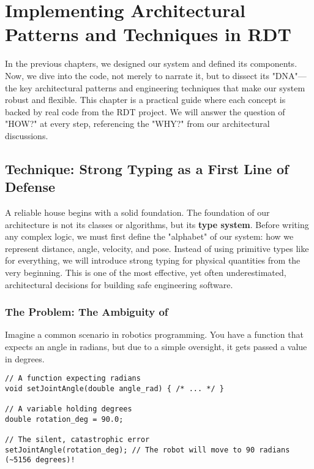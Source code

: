 
\chapter{Implementing Architectural Patterns and Techniques in RDT}
\label{chap:implementation_patterns}

In the previous chapters, we designed our system and defined its components. Now, we dive into the code, not merely to narrate it, but to dissect its "DNA"—the key architectural patterns and engineering techniques that make our system robust and flexible. This chapter is a practical guide where each concept is backed by real code from the RDT project. We will answer the question of "HOW?" at every step, referencing the "WHY?" from our architectural discussions.

\section{Technique: Strong Typing as a First Line of Defense}
\label{sec:strong_typing}

A reliable house begins with a solid foundation. The foundation of our architecture is not its classes or algorithms, but its \textbf{type system}. Before writing any complex logic, we must first define the "alphabet" of our system: how we represent distance, angle, velocity, and pose. Instead of using primitive types like  for everything, we will introduce strong typing for physical quantities from the very beginning. This is one of the most effective, yet often underestimated, architectural decisions for building safe engineering software.

\subsection{The Problem: The Ambiguity of }
\label{subsec:problem_of_double}

Imagine a common scenario in robotics programming. You have a function that expects an angle in radians, but due to a simple oversight, it gets passed a value in degrees.

\begin{verbatim}
// A function expecting radians
void setJointAngle(double angle_rad) { /* ... */ }

// A variable holding degrees
double rotation_deg = 90.0;

// The silent, catastrophic error
setJointAngle(rotation_deg); // The robot will move to 90 radians (~5156 degrees)!
\end{verbatim}
\label{lst:unit-conversion-error}

